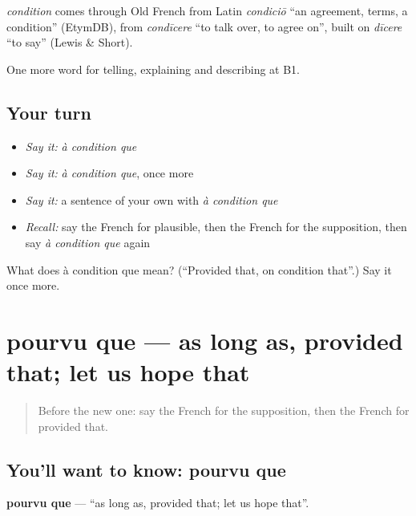 \begin{cousinweb}
\emph{condition} comes through Old French from Latin \emph{condiciō} \textquotedblleft{}an agreement, terms, a condition\textquotedblright{} (EtymDB), from \emph{condīcere} \textquotedblleft{}to talk over, to agree on\textquotedblright{}, built on \emph{dīcere} \textquotedblleft{}to say\textquotedblright{} (Lewis \& Short).
\end{cousinweb}

\begin{grammarlens}[title={What you've built}]
One more word for telling, explaining and describing at B1.
\end{grammarlens}

\subsection*{Your turn}
\begin{itemize}
\raggedright
  \item \emph{Say it:} \emph{à condition que}
  \item \emph{Say it:} \emph{à condition que}, once more
  \item \emph{Say it:} a sentence of your own with \emph{à condition que}
  \item \emph{Recall:} say the French for plausible, then the French for the supposition, then say \emph{à condition que} again
\end{itemize}

\begin{tcolorbox}[breakable,colback=teal!4,colframe=teal!35!black,title={Before you move on}]
What does à condition que mean? (\textquotedblleft{}Provided that, on condition that\textquotedblright{}.) Say it once more.
\end{tcolorbox}
\section[pourvu que]{pourvu que — as long as, provided that; let us hope that}

\label{lesson:FR-C368-pourvu-que}



\begin{quote}
Before the new one: say the French for the supposition, then the French for provided that.
\end{quote}

\subsection*{You'll want to know: pourvu que}
\textbf{pourvu que} — \textquotedblleft{}as long as, provided that; let us hope that\textquotedblright{}.

